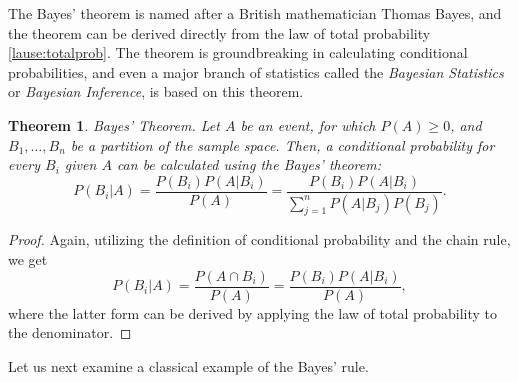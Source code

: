 \documentclass[12pt,a4paper,leqno]{report}
\theoremstyle{plain}
\newtheorem{lause}[equation]{Theorem}
\theoremstyle{definition}
\begin{document}
The Bayes' theorem is named after a British mathematician Thomas Bayes, and the theorem can be derived directly from the law of total probability \ref{lause:totalprob}. The theorem is groundbreaking in calculating conditional probabilities, and even a major branch of statistics called the \emph{Bayesian Statistics} or \emph{Bayesian Inference}, is based on this theorem. 

\begin{lause}
Bayes' Theorem. Let $A$ be an event, for which $P(A) \geq 0$, and $B_1, \dots , B_n$ be a partition of the sample space. Then, a conditional probability for every $B_i$ given $A$ can be calculated using the Bayes' theorem:
\[
P(B_i | A) = \frac{P(B_i)P(A|B_i)}{P(A)} = \frac{P(B_i)P(A|B_i)}{\sum_{j=1}^n P(A|B_j)P(B_j)}.
\]
\end{lause}

\begin{proof}
Again, utilizing the definition of conditional probability and the chain rule, we get
\[
P(B_i | A) = \frac{P(A \cap B_i)}{P(A)} = \frac{P(B_i)P(A|B_i)}{P(A)},
\]
where the latter form can be derived by applying the law of total probability to the denominator.
\end{proof}

Let us next examine a classical example of the Bayes' rule.
\end{document}
